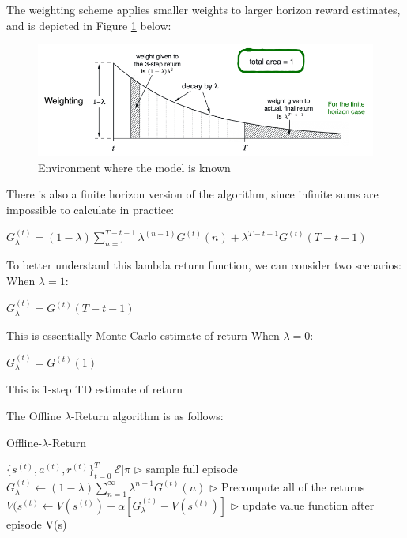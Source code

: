 \documentclass[11pt]{article}
\begin{document}
The weighting scheme applies smaller weights to larger horizon reward estimates, and is depicted in Figure \ref{fig:lambda-return_weighting} below:

\begin{figure}[H]
    \centering
    \includegraphics[width=0.35\linewidth]{images/lambda-return_weighting.png}
    \caption{Environment where the model is known}
    \label{fig:lambda-return_weighting}
\end{figure}

There is also a finite horizon version of the algorithm, since infinite sums are impossible to calculate in practice:

\begin{center}\begin{large}
    $G_{\lambda}^{(t)} =  (1 - \lambda) \sum\limits_{n=1}^{T-t-1} \lambda^{(n-1)} G^{(t)}(n) + \lambda^{T-t-1}G^{(t)}(T-t-1)$
\end{large}\end{center}

To better understand this lambda return function, we can consider two scenarios: \\ 
When $\lambda = 1$:
\begin{center}\begin{large}
    $G_{\lambda}^{(t)} =  G^{(t)}(T-t-1)$
\end{large}\end{center}
This is essentially Monte Carlo estimate of return
When $\lambda = 0$:

\begin{center}\begin{large}
$G_{\lambda}^{(t)} =G^{(t)}(1)$
\end{large}\end{center}
This is 1-step TD estimate of return

The Offline $\lambda$-Return algorithm is as follows:

\begin{algorithm}[H]
\caption{Offline-$\lambda$-Return}
\label{algo:OLR}
\begin{algorithmic}[1]
\STATE $\{s^{(t)}, a^{(t)}, r^{(t)}\}_{t=0}^T ~ \mathcal{E}|\pi$ \hfill $\triangleright$ sample full episode
\STATE $G_{\lambda}^{(t)} \xleftarrow{} (1 - \lambda) \sum_{n=1}^{\infty} \lambda^{n-1} G^{(t)}(n)$ \hfill $\triangleright$ Precompute all of the returns
\ENDFOR
{} 
\STATE $V(s^({t}) \xleftarrow{} V(s^{(t)}) + \alpha [G_{\lambda}^{(t)} - V(s^{(t)})]$ \hfill $\triangleright$ update value function after episode
\ENDFOR
\ENDFOR
\RETURN V(s)
\end{algorithmic}
\end{algorithm}
\end{document}
